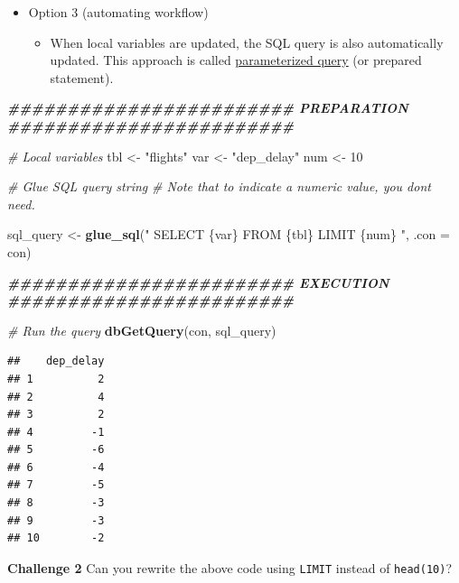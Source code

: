 \documentclass[
]{book}
\newenvironment{Shaded}{\begin{snugshade}}{\end{snugshade}}
\newcommand{\AttributeTok}[1]{\textcolor[rgb]{0.13,0.29,0.53}{#1}}
\newcommand{\CommentTok}[1]{\textcolor[rgb]{0.56,0.35,0.01}{\textit{#1}}}
\newcommand{\DecValTok}[1]{\textcolor[rgb]{0.00,0.00,0.81}{#1}}
\newcommand{\DocumentationTok}[1]{\textcolor[rgb]{0.56,0.35,0.01}{\textbf{\textit{#1}}}}
\newcommand{\FunctionTok}[1]{\textcolor[rgb]{0.13,0.29,0.53}{\textbf{#1}}}
\newcommand{\NormalTok}[1]{#1}
\newcommand{\OtherTok}[1]{\textcolor[rgb]{0.56,0.35,0.01}{#1}}
\newcommand{\StringTok}[1]{\textcolor[rgb]{0.31,0.60,0.02}{#1}}
\providecommand{\tightlist}{%
  \setlength{\itemsep}{0pt}\setlength{\parskip}{0pt}}
\begin{document}
\begin{itemize}
\item
  Option 3 (automating workflow)

  \begin{itemize}
  \tightlist
  \item
    When local variables are updated, the SQL query is also automatically updated. This approach is called \href{https://www.php.net/manual/en/pdo.prepared-statements.php}{parameterized query} (or prepared statement).
  \end{itemize}
\end{itemize}

\begin{Shaded}
\begin{Highlighting}[]
\DocumentationTok{\#\#\#\#\#\#\#\#\#\#\#\#\#\#\#\#\#\#\#\#\#\#\#\# PREPARATION \#\#\#\#\#\#\#\#\#\#\#\#\#\#\#\#\#\#\#\#\#\#\#\#}

\CommentTok{\# Local variables }
\NormalTok{tbl }\OtherTok{\textless{}{-}} \StringTok{"flights"}
\NormalTok{var }\OtherTok{\textless{}{-}} \StringTok{"dep\_delay"}
\NormalTok{num }\OtherTok{\textless{}{-}} \DecValTok{10}

\CommentTok{\# Glue SQL query string }
\CommentTok{\# Note that to indicate a numeric value, you don\textquotesingle{}t need.}

\NormalTok{sql\_query }\OtherTok{\textless{}{-}} \FunctionTok{glue\_sql}\NormalTok{(}\StringTok{"}
\StringTok{  SELECT \{\textasciigrave{}var\textasciigrave{}\}}
\StringTok{  FROM \{\textasciigrave{}tbl\textasciigrave{}\}}
\StringTok{  LIMIT \{num\} }
\StringTok{  "}\NormalTok{, }\AttributeTok{.con =}\NormalTok{ con)}

\DocumentationTok{\#\#\#\#\#\#\#\#\#\#\#\#\#\#\#\#\#\#\#\#\#\#\#\# EXECUTION \#\#\#\#\#\#\#\#\#\#\#\#\#\#\#\#\#\#\#\#\#\#\#\#}

\CommentTok{\# Run the query }
\FunctionTok{dbGetQuery}\NormalTok{(con, sql\_query)}
\end{Highlighting}
\end{Shaded}

\begin{verbatim}
##    dep_delay
## 1          2
## 2          4
## 3          2
## 4         -1
## 5         -6
## 6         -4
## 7         -5
## 8         -3
## 9         -3
## 10        -2
\end{verbatim}

\textbf{Challenge 2}
Can you rewrite the above code using \texttt{LIMIT} instead of \texttt{head(10)}?
\end{document}

